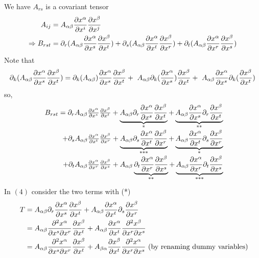 We have $A_{rs}$ is a covariant tensor
\begin{align}
\ A_{ij} &= A_{\alpha\beta}\pdv{x^{\alpha}}{x^{i}}\pdv{x^{\beta}}{x^{j}}\\
\Rightarrow B_{rst} &= \partial_{r}{(A_{\alpha\beta}\pdv{x^{\alpha}}{x^{s}}\pdv{x^{\beta}}{x^{t}})} + \partial_{s}{(A_{\alpha\beta}\pdv{x^{\alpha}}{x^{t}}\pdv{x^{\beta}}{x^{r}})} +\partial_{t}{(A_{\alpha\beta}\pdv{x^{\alpha}}{x^{r}}\pdv{x^{\beta}}{x^{s}})}
\end{align}
Note that
\begin{align}
\partial_{k}{(A_{\alpha\beta}\pdv{x^{\alpha}}{x^{s}}\pdv{x^{\beta}}{x^{t}})} = 
\partial_{k}{(A_{\alpha\beta})}\pdv{x^{\alpha}}{x^{s}}\pdv{x^{\beta}}{x^{t}}+
\ A_{\alpha\beta}\partial_{k}{(\pdv{x^{\alpha}}{x^{s}})}\pdv{x^{\beta}}{x^{t}}+
\ A_{\alpha\beta}\pdv{x^{\alpha}}{x^{s}} \partial_{k}{(\pdv{x^{\beta}}{x^{t}})}
\end{align}
so, 
\begin{align}
\begin{array}{r c l}
\ B_{rst} = \partial_{r}{A_{\alpha\beta}}\pdv{x^{\alpha}}{x^{s}}\pdv{x^{\beta}}{x^{t}}+ \underbrace{A_{\alpha\beta}\partial_{r}{\pdv{x^{\alpha}}{x^{s}}}\pdv{x^{\beta}}{x^{t}}}_\text{*} +\underbrace{A_{\alpha\beta}\pdv{x^{\alpha}}{x^{s}}\partial_{r}{\pdv{x^{\beta}}{x^{t}}}}_\text{**}\\ +
\partial_{s}{A_{\alpha\beta}}\pdv{x^{\alpha}}{x^{t}}\pdv{x^{\beta}}{x^{r}}+\underbrace{A_{\alpha\beta}\partial_{s}{\pdv{x^{\alpha}}{x^{t}}}\pdv{x^{\beta}}{x^{r}}}_\text{***}+\underbrace{A_{\alpha\beta}\pdv{x^{\alpha}}{x^{t}}\partial_{s}{\pdv{x^{\beta}}{x^{r}}}}_\text{*}\\+
\partial_{t}{A_{\alpha\beta}}\pdv{x^{\alpha}}{x^{r}}\pdv{x^{\beta}}{x^{s}}+A_{\alpha\beta}\underbrace{\partial_{t}{\pdv{x^{\alpha}}{x^{r}}}\pdv{x^{\beta}}{x^{s}}}_\text{**}+\underbrace{A_{\alpha\beta}\pdv{x^{\alpha}}{x^{r}}\partial_{t}{\pdv{x^{\beta}}{x^{s}}}}_\text{***}
\end{array}
\end{align}
In $(4)$ consider the two terms with (*) 
\begin{align*}
\ T &= A_{\alpha\beta}\partial_{r}{\pdv{x^{\alpha}}{x^{s}}}\pdv{x^{\beta}}{x^{t}}+ A_{\alpha\beta}\pdv{x^{\alpha}}{x^{t}}\partial_{s}{\pdv{x^{\beta}}{x^{r}}}\\
& = A_{\alpha\beta}\pdv{x^{\alpha}}{x^{s}}{x^{r}}\pdv{x^{\beta}}{x^{t}}+ A_{\alpha\beta}\pdv{x^{\alpha}}{x^{t}}\pdv{x^{\beta}}{x^{r}}{x^{s}}\\
& = A_{\alpha\beta}\pdv{x^{\alpha}}{x^{s}}{x^{r}}\pdv{x^{\beta}}{x^{t}}+ A_{\beta\alpha}\pdv{x^{\beta}}{x^{t}}\pdv{x^{\alpha}}{x^{r}}{x^{s}} \text{ (by renaming dummy variables)}
\end{align*}
